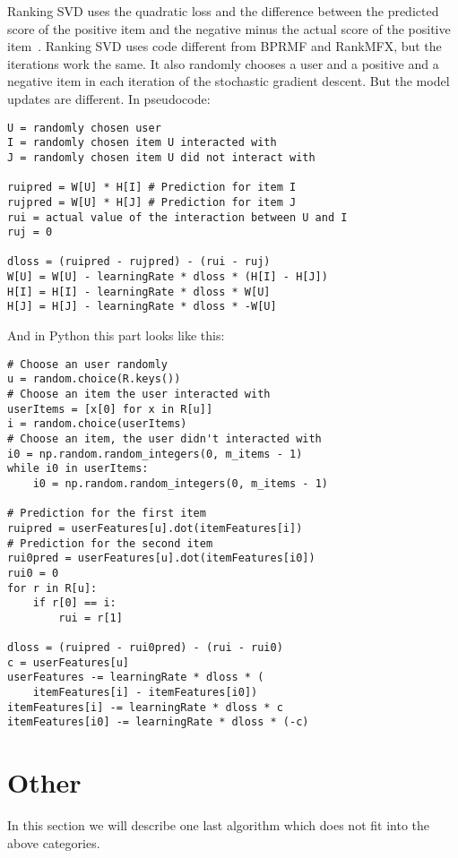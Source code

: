 Ranking SVD uses the quadratic loss and the difference between the
predicted score of the positive item and the negative minus the actual
score of the positive item~\cite{jahrer2011collaborative}.
Ranking SVD uses code different from BPRMF and RankMFX, but the iterations
work the same. It also randomly chooses a user and a positive and a
negative item in each iteration of the stochastic gradient descent. 
But the model updates are different. In pseudocode:
\begin{lstlisting}[style=pseudocode]
U = randomly chosen user
I = randomly chosen item U interacted with
J = randomly chosen item U did not interact with

ruipred = W[U] * H[I] # Prediction for item I
rujpred = W[U] * H[J] # Prediction for item J
rui = actual value of the interaction between U and I 
ruj = 0

dloss = (ruipred - rujpred) - (rui - ruj)
W[U] = W[U] - learningRate * dloss * (H[I] - H[J])
H[I] = H[I] - learningRate * dloss * W[U]
H[J] = H[J] - learningRate * dloss * -W[U]
\end{lstlisting}
And in Python this part looks like this:
\begin{lstlisting}[style=python]
# Choose an user randomly
u = random.choice(R.keys())
# Choose an item the user interacted with
userItems = [x[0] for x in R[u]]
i = random.choice(userItems)
# Choose an item, the user didn't interacted with
i0 = np.random.random_integers(0, m_items - 1)
while i0 in userItems:
    i0 = np.random.random_integers(0, m_items - 1)

# Prediction for the first item
ruipred = userFeatures[u].dot(itemFeatures[i])
# Prediction for the second item
rui0pred = userFeatures[u].dot(itemFeatures[i0])
rui0 = 0
for r in R[u]:
    if r[0] == i:
        rui = r[1]

dloss = (ruipred - rui0pred) - (rui - rui0)
c = userFeatures[u]
userFeatures -= learningRate * dloss * (
    itemFeatures[i] - itemFeatures[i0])
itemFeatures[i] -= learningRate * dloss * c
itemFeatures[i0] -= learningRate * dloss * (-c)
\end{lstlisting}


\section{Other}
In this section we will describe one last algorithm 
which does not fit into the above categories.
